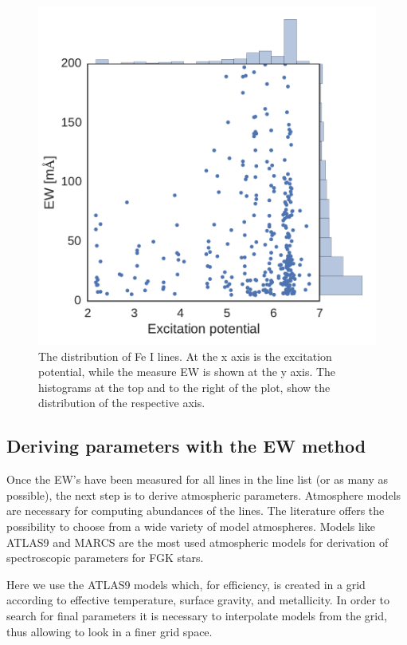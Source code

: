 \documentclass{aa}
\begin{document}
\begin{figure}[htpb]
    \centering
    \includegraphics[width=0.9\linewidth]{figures/EWvsEP_cut.pdf}
    \caption{The distribution of Fe I lines. At the x axis is the
    excitation potential, while the measure EW is shown at the y axis.
    The histograms at the top and to the right of the plot, show the
    distribution of the respective axis.}
    \label{fig:Fe1_after_recal}
\end{figure}



\subsection{Deriving parameters with the EW method}
\label{sec:deriving_parameters_with_the_ew_method}

Once the EW's have been measured for all lines in the line list (or as
many as possible), the next step is to derive atmospheric parameters.
Atmosphere models are necessary for computing abundances of the lines.
The literature offers the possibility to choose from a wide variety
of model atmospheres. Models like ATLAS9 \citep{Kurucz1993} and
MARCS \citep{Gustafson2008} are the most used atmospheric models for
derivation of spectroscopic parameters for FGK stars.

Here we use the ATLAS9 models which, for efficiency, is created in
a grid according to effective temperature, surface gravity, and
metallicity. In order to search for final parameters it is necessary to
interpolate models from the grid, thus allowing to look in a finer grid
space.
\end{document}
